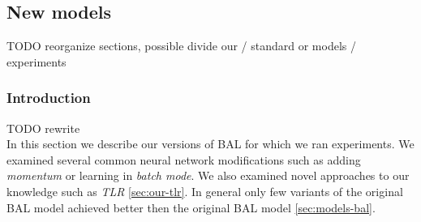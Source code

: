\subsection{New models}
\label{sec:our-models} 
TODO reorganize sections, possible divide our / standard or models / experiments\\ 

\subsubsection*{Introduction} 
TODO rewrite  \\
In this section we describe our versions of BAL for which we ran experiments. We examined several common neural network modifications such as adding \emph{momentum} or learning in \emph{batch mode}. We also examined novel approaches to our knowledge such as \emph{TLR} \ref{sec:our-tlr}. In general only few variants of the original BAL model achieved better then the original BAL model \ref{sec:models-bal}. 


 

 



